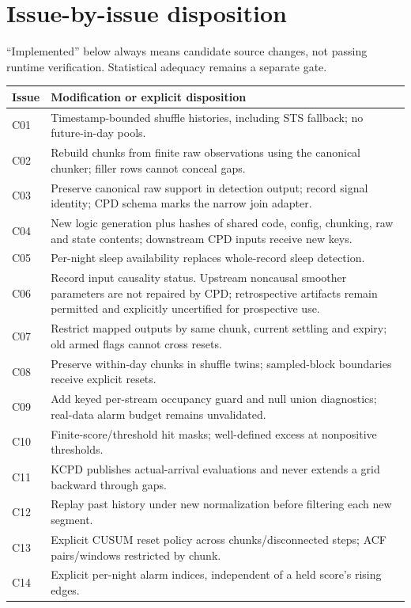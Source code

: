 \documentclass[11pt,a4paper]{article}
\begin{document}
\section{Issue-by-issue disposition}
``Implemented'' below always means candidate source changes, not passing runtime
verification. Statistical adequacy remains a separate gate.
\begin{longtable}{@{}p{}p{}@{}}
\toprule Issue & Modification or explicit disposition \\
\midrule\endhead
C01 & Timestamp-bounded shuffle histories, including STS fallback; no future-in-day pools. \\
C02 & Rebuild chunks from finite raw observations using the canonical chunker; filler rows cannot conceal gaps. \\
C03 & Preserve canonical raw support in detection output; record signal identity; CPD schema marks the narrow join adapter. \\
C04 & New logic generation plus hashes of shared code, config, chunking, raw and state contents; downstream CPD inputs receive new keys. \\
C05 & Per-night sleep availability replaces whole-record sleep detection. \\
C06 & Record input causality status. Upstream noncausal smoother parameters are not repaired by CPD; retrospective artifacts remain permitted and explicitly uncertified for prospective use. \\
C07 & Restrict mapped outputs by same chunk, current settling and expiry; old armed flags cannot cross resets. \\
C08 & Preserve within-day chunks in shuffle twins; sampled-block boundaries receive explicit resets. \\
C09 & Add keyed per-stream occupancy guard and null union diagnostics; real-data alarm budget remains unvalidated. \\
C10 & Finite-score/threshold hit masks; well-defined excess at nonpositive thresholds. \\
C11 & KCPD publishes actual-arrival evaluations and never extends a grid backward through gaps. \\
C12 & Replay past history under new normalization before filtering each new segment. \\
C13 & Explicit CUSUM reset policy across chunks/disconnected steps; ACF pairs/windows restricted by chunk. \\
C14 & Explicit per-night alarm indices, independent of a held score's rising edges. \\

\end{longtable}
\end{document}

